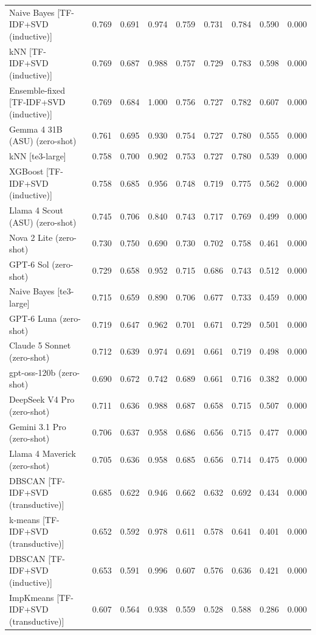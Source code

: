 \begin{table}[htbp]
\begin{tabular}{lcccccccc}
Naive Bayes [TF-IDF+SVD (inductive)] & 0.769 & 0.691 & 0.974 & 0.759 & 0.731 & 0.784 & 0.590 & 0.000 \\
kNN [TF-IDF+SVD (inductive)] & 0.769 & 0.687 & 0.988 & 0.757 & 0.729 & 0.783 & 0.598 & 0.000 \\
Ensemble-fixed [TF-IDF+SVD (inductive)] & 0.769 & 0.684 & 1.000 & 0.756 & 0.727 & 0.782 & 0.607 & 0.000 \\
Gemma 4 31B (ASU) (zero-shot) & 0.761 & 0.695 & 0.930 & 0.754 & 0.727 & 0.780 & 0.555 & 0.000 \\
kNN [te3-large] & 0.758 & 0.700 & 0.902 & 0.753 & 0.727 & 0.780 & 0.539 & 0.000 \\
XGBoost [TF-IDF+SVD (inductive)] & 0.758 & 0.685 & 0.956 & 0.748 & 0.719 & 0.775 & 0.562 & 0.000 \\
Llama 4 Scout (ASU) (zero-shot) & 0.745 & 0.706 & 0.840 & 0.743 & 0.717 & 0.769 & 0.499 & 0.000 \\
Nova 2 Lite (zero-shot) & 0.730 & 0.750 & 0.690 & 0.730 & 0.702 & 0.758 & 0.461 & 0.000 \\
GPT-6 Sol (zero-shot) & 0.729 & 0.658 & 0.952 & 0.715 & 0.686 & 0.743 & 0.512 & 0.000 \\
Naive Bayes [te3-large] & 0.715 & 0.659 & 0.890 & 0.706 & 0.677 & 0.733 & 0.459 & 0.000 \\
GPT-6 Luna (zero-shot) & 0.719 & 0.647 & 0.962 & 0.701 & 0.671 & 0.729 & 0.501 & 0.000 \\
Claude 5 Sonnet (zero-shot) & 0.712 & 0.639 & 0.974 & 0.691 & 0.661 & 0.719 & 0.498 & 0.000 \\
gpt-oss-120b (zero-shot) & 0.690 & 0.672 & 0.742 & 0.689 & 0.661 & 0.716 & 0.382 & 0.000 \\
DeepSeek V4 Pro (zero-shot) & 0.711 & 0.636 & 0.988 & 0.687 & 0.658 & 0.715 & 0.507 & 0.000 \\
Gemini 3.1 Pro (zero-shot) & 0.706 & 0.637 & 0.958 & 0.686 & 0.656 & 0.715 & 0.477 & 0.000 \\
Llama 4 Maverick (zero-shot) & 0.705 & 0.636 & 0.958 & 0.685 & 0.656 & 0.714 & 0.475 & 0.000 \\
DBSCAN [TF-IDF+SVD (transductive)] & 0.685 & 0.622 & 0.946 & 0.662 & 0.632 & 0.692 & 0.434 & 0.000 \\
k-means [TF-IDF+SVD (transductive)] & 0.652 & 0.592 & 0.978 & 0.611 & 0.578 & 0.641 & 0.401 & 0.000 \\
DBSCAN [TF-IDF+SVD (inductive)] & 0.653 & 0.591 & 0.996 & 0.607 & 0.576 & 0.636 & 0.421 & 0.000 \\
ImpKmeans [TF-IDF+SVD (transductive)] & 0.607 & 0.564 & 0.938 & 0.559 & 0.528 & 0.588 & 0.286 & 0.000 \\

\end{tabular}
\end{table}
